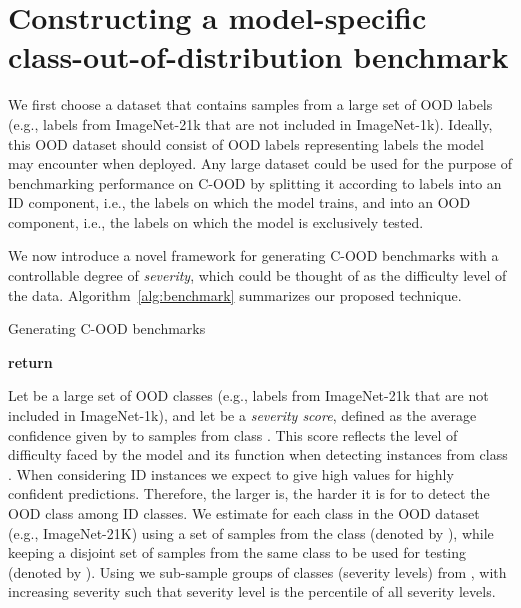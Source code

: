 \documentclass[table]{article} \usepackage{PRIMEarxiv}
\begin{document}
\section{Constructing a model-specific class-out-of-distribution benchmark}
\label{sec:construction}
We first choose a dataset that contains samples from a large set of OOD labels (e.g., labels from ImageNet-21k that are not included in ImageNet-1k). Ideally, this OOD dataset should consist of OOD labels representing labels the model may encounter when deployed.
Any large dataset could be used for the purpose of benchmarking performance on C-OOD by splitting it according to labels into an ID component, i.e., the labels on which the model trains, and into an OOD component, i.e., the labels on which the model is exclusively tested. 

We now introduce a novel framework for generating C-OOD
benchmarks with a controllable degree of \emph{severity}, which could be thought of as the difficulty level of the data. Algorithm~\ref{alg:benchmark} summarizes our proposed technique.
\begin{algorithm}[htb]
\caption{Generating C-OOD benchmarks}\label{alg:benchmark}
\begin{algorithmic}[1]
\Function{}{}
\For{}
\State 
\State 
\State 
\EndFor\label{algfor}
\State 
\For{}
\State 
\EndFor\label{algfor2}
\For{}
\State 
\EndFor\label{algfor2}
\State \textbf{return} 
\EndFunction
\end{algorithmic}
\end{algorithm}
Let  be a large set of OOD classes (e.g., labels from ImageNet-21k that are not included in ImageNet-1k), and let  be a \emph{severity score}, defined as the average confidence given by  to samples from class . This score reflects the level of difficulty faced by the model  and its  function when detecting instances from class . 
When considering ID instances we expect  to give high values for highly confident predictions. Therefore, the larger  is, the harder it is for  to detect the OOD class  among ID classes. We estimate  for
each class in the OOD dataset (e.g., ImageNet-21K) using a set of samples from the class (denoted by ), while keeping a disjoint set of samples from the same class to be used for testing (denoted by ).
Using  we sub-sample groups of classes (severity levels) from , with increasing severity such that severity level  is the  percentile of all severity levels. 
\end{document}
